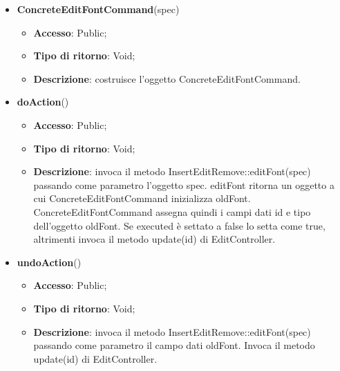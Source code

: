 {{{\begin{itemize}
\begin{itemize}
\begin{itemize}
		\end{itemize}
			\end{itemize}
			\end{itemize}
		\begin{itemize}
			\item \textbf{ConcreteEditFontCommand}(spec)
			\begin{itemize}
				\item \textbf{Accesso}: Public;
				\item \textbf{Tipo di ritorno}: Void;
				\item \textbf{Descrizione}: costruisce l’oggetto ConcreteEditFontCommand.
			\end{itemize}
			\item \textbf{doAction}()
			\begin{itemize}
				\item \textbf{Accesso}: Public;
				\item \textbf{Tipo di ritorno}: Void;
				\item \textbf{Descrizione}: invoca il metodo InsertEditRemove::editFont(spec) passando come parametro l'oggetto spec. editFont ritorna un oggetto a cui ConcreteEditFontCommand inizializza oldFont. ConcreteEditFontCommand assegna quindi i campi dati id e tipo dell'oggetto oldFont. Se executed è settato a false lo setta come true, altrimenti invoca il metodo update(id) di EditController.
			\end{itemize}
			\item \textbf{undoAction}()
			\begin{itemize}
				\item \textbf{Accesso}: Public;
				\item \textbf{Tipo di ritorno}: Void;
				\item \textbf{Descrizione}: invoca il metodo InsertEditRemove::editFont(spec) passando come parametro il campo dati oldFont. Invoca il metodo update(id) di EditController.
			\end{itemize}
		\end{itemize}
}
}}
